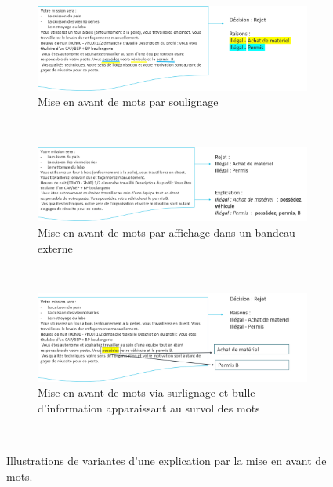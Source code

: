  \begin{figure}[htpb!]
     \centering
     \begin{subfigure}[b]{\textwidth}
        \centering \includegraphics[width=\textwidth]{S2-Explicabilite_locale/figures/prototype_mot1.png}
        \caption{Mise en avant de mots par soulignage}
        \label{fig:prototype_mot1}
     \end{subfigure}
     ~
     \begin{subfigure}[b]{\textwidth}
        \centering \includegraphics[width=\textwidth]{S2-Explicabilite_locale/figures/prototype_mot3.png}
        \caption{Mise en avant de mots par affichage dans un bandeau externe}
        \label{fig:prototype_mot2}
     \end{subfigure}
     ~
     \begin{subfigure}[b]{\textwidth}
        \centering \includegraphics[width=\textwidth]{S2-Explicabilite_locale/figures/prototype_mot2.png}
        \caption{Mise en avant de mots via surlignage et bulle d'information apparaissant au survol des mots}
        \label{fig:prototype_mot3}
     \end{subfigure}
     ~
     \caption{Illustrations de variantes d'une explication par la mise en avant de mots.
     }\label{fig:prototype_mot}
 \end{figure}

